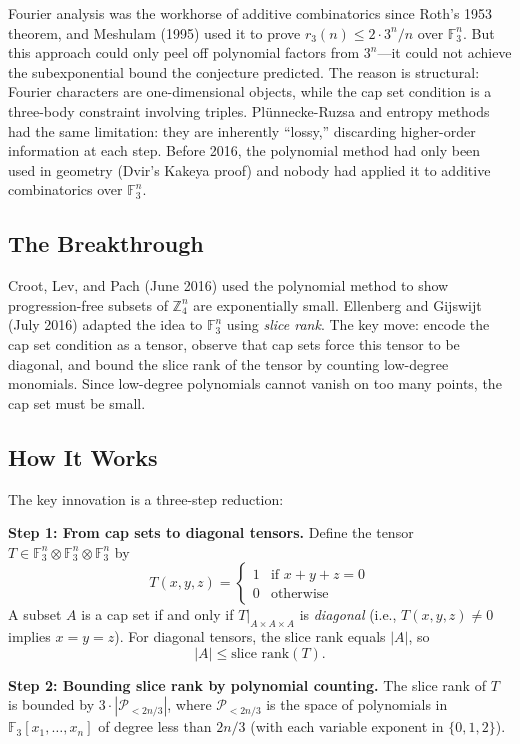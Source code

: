 Fourier analysis was the workhorse of additive combinatorics since Roth's 1953 theorem, and Meshulam (1995) used it to prove $r_3(n) \le 2 \cdot 3^n / n$ over $\mathbb{F}_3^n$. But this approach could only peel off polynomial factors from $3^n$---it could not achieve the subexponential bound the conjecture predicted. The reason is structural: Fourier characters are one-dimensional objects, while the cap set condition is a three-body constraint involving triples. Pl\"unnecke-Ruzsa and entropy methods had the same limitation: they are inherently ``lossy,'' discarding higher-order information at each step. Before 2016, the polynomial method had only been used in geometry (Dvir's Kakeya proof) and nobody had applied it to additive combinatorics over $\mathbb{F}_3^n$.

\subsection{The Breakthrough}

Croot, Lev, and Pach (June 2016) used the polynomial method to show progression-free subsets of $\mathbb{Z}_4^n$ are exponentially small. Ellenberg and Gijswijt (July 2016) adapted the idea to $\mathbb{F}_3^n$ using \emph{slice rank}. The key move: encode the cap set condition as a tensor, observe that cap sets force this tensor to be diagonal, and bound the slice rank of the tensor by counting low-degree monomials. Since low-degree polynomials cannot vanish on too many points, the cap set must be small.

\subsection{How It Works}

The key innovation is a three-step reduction:

\textbf{Step 1: From cap sets to diagonal tensors.} Define the tensor $T \in \mathbb{F}_3^n \otimes \mathbb{F}_3^n \otimes \mathbb{F}_3^n$ by
\[
T(x,y,z) = \begin{cases} 1 & \text{if } x + y + z = 0 \\ 0 & \text{otherwise} \end{cases}
\]
A subset $A$ is a cap set if and only if $T|_{A \times A \times A}$ is \emph{diagonal} (i.e., $T(x,y,z) \neq 0$ implies $x = y = z$). For diagonal tensors, the slice rank equals $|A|$, so
\[
|A| \le \text{slice rank}(T).
\]

\textbf{Step 2: Bounding slice rank by polynomial counting.} The slice rank of $T$ is bounded by $3 \cdot |\mathcal{P}_{<2n/3}|$, where $\mathcal{P}_{<2n/3}$ is the space of polynomials in $\mathbb{F}_3[x_1, \ldots, x_n]$ of degree less than $2n/3$ (with each variable exponent in $\{0,1,2\}$).

